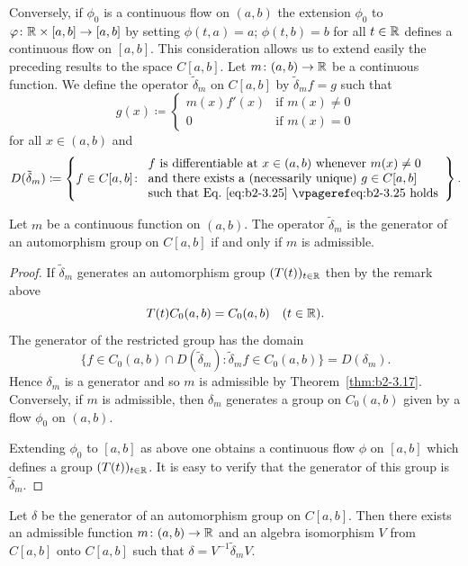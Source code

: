 Conversely, if\/ $\phi_{0}$ is a continuous flow on $(a,b)$ the extension $\phi_{0}$ to $\phi \colon \R \times [a,b] \to [a,b]$ by setting $\phi(t,a) = a$; $\phi(t,b) = b$ for all $t \in \mathbb{R}$ defines a continuous flow on $[a,b]$.
This consideration allows us to extend easily the preceding results to the space $C[a,b]$.
Let $m \colon (a,b) \to \mathbb{R}$ be a continuous function.
We define the operator $\tilde{\delta}_{m}$ on $C[a,b]$ by $\tilde{\delta}_{m}f = g$ such that
\begin{equation}\label{eq:b2-3.25}
g(x) \coloneq \begin{cases}
    m(x)f'(x) & \text{if } m(x) \neq 0 \\
    0 & \text{if } m(x) = 0
\end{cases}
\end{equation}
for all $x \in (a,b)$ and 
\[
D(\tilde{\delta}_{m}) \coloneq \left\{ f \in C[a,b] \colon 
\begin{array}{l}
f \text{ is differentiable at } x \in (a,b) \text{ whenever } m(x) \neq 0 \\ 
\text{and there exists a (necessarily unique) } g \in C[a,b] \\
\text{such that Eq.~\myeqpageref{eq:b2-3.25} holds} 
\end{array} \right\}.
\]
\begin{theorem}\label{thm:b2-3.26}
%
Let $m$ be a continuous function on $(a,b)$.
The operator $\tilde{\delta}_{m}$ is the generator of an automorphism group on $C[a,b]$ if and only if\/ $m$ is admissible.
\end{theorem}
\begin{proof}
If\/ $\tilde{\delta}_{m}$ generates an automorphism group $(T(t))_{t \in \mathbb{R}}$ then by the remark above 
%
\[
	T(t)C_{0}(a,b) = C_{0}(a,b) \quad (t \in \mathbb{R}) .
\]
%
The generator of the restricted group has the domain 
%
\[
	\{ f \in C_{0}(a,b) \cap D(\tilde{\delta}_{m}) 
		\colon \tilde{\delta}_{m}f \in C_{0}(a,b) \} = D(\delta_{m}) .
\]
%
Hence $\delta_{m}$ is a generator and so $m$ is admissible by Theorem~\ref{thm:b2-3.17}.
Conversely, if\/ $m$ is admissible, then $\delta_{m}$ generates a group on $C_{0}(a,b)$ given by a flow $\phi_{0}$ on $(a,b)$.

Extending $\phi_{0}$ to $[a,b]$ as above one obtains a continuous flow $\phi$ on $[a,b]$ which defines a group $(T(t))_{t \in \mathbb{R}}$.
It is easy to verify that the generator of this group is $\tilde{\delta}_{m}$.
\end{proof}
\begin{theorem}\label{thm:b2-3.27}
%
Let $\delta$ be the generator of an automorphism group on $C[a,b]$.
Then there exists an admissible function $m \colon (a,b) \to \mathbb{R}$ and an algebra isomorphism $V$ from $C[a,b]$ onto $C[a,b]$ such that $\delta = V^{-1}\tilde{\delta}_{m}V$.
\end{theorem}
